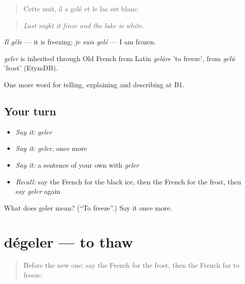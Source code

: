 \begin{quote}
Cette nuit, il a gelé et le lac est blanc.
\end{quote}

\begin{quote}
\emph{Last night it froze and the lake is white.}
\end{quote}

\emph{Il gèle} — it is freezing; \emph{je suis gelé} — I am frozen.

\begin{cousinweb}
\emph{geler} is inherited through Old French from Latin \emph{gelāre} 'to freeze', from \emph{gelū} 'frost' (EtymDB).
\end{cousinweb}

\begin{grammarlens}[title={What you've built}]
One more word for telling, explaining and describing at B1.
\end{grammarlens}

\subsection*{Your turn}
\begin{itemize}
\raggedright
  \item \emph{Say it:} \emph{geler}
  \item \emph{Say it:} \emph{geler}, once more
  \item \emph{Say it:} a sentence of your own with \emph{geler}
  \item \emph{Recall:} say the French for the black ice, then the French for the frost, then say \emph{geler} again
\end{itemize}

\begin{tcolorbox}[breakable,colback=teal!4,colframe=teal!35!black,title={Before you move on}]
What does geler mean? (\textquotedblleft{}To freeze\textquotedblright{}.) Say it once more.
\end{tcolorbox}
\section[dégeler]{dégeler — to thaw}

\label{lesson:FR-C463-degeler}



\begin{quote}
Before the new one: say the French for the frost, then the French for to freeze.
\end{quote}

